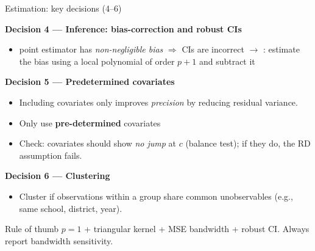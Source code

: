 \documentclass[aspectratio=169, 10pt]{beamer}
\begin{document}
\begin{frame}[shrink=5]{Estimation: key decisions (4--6) \citep{cattaneo2019}}


      \textbf{Decision 4 — Inference: bias-correction and robust CIs}
      \begin{itemize}
        \item point estimator has
              \emph{non-negligible bias} $\Rightarrow$ CIs are incorrect $\rightarrow$ \citet{calonico2014}:
              estimate the bias using a local polynomial of
              order $p+1$ and subtract it
      \end{itemize}

      \smallskip
      \textbf{Decision 5 — Predetermined covariates}
      \begin{itemize}
        \item Including covariates only improves \emph{precision}
              by reducing residual variance.
        \item Only use \textbf{pre-determined} covariates
        \item Check: covariates should show \emph{no jump} at $c$
              (balance test); if they do, the RD assumption fails.
      \end{itemize}

      \smallskip
      \textbf{Decision 6 — Clustering}
      \begin{itemize}
        \item Cluster if observations within a group share common
              unobservables (e.g., same school, district, year).
      \end{itemize}
\bigskip
      \begin{block}{Rule of thumb}
        $p=1$ + triangular kernel + MSE bandwidth + robust CI.
        Always report bandwidth sensitivity.
      \end{block}


\end{frame}
\end{document}
